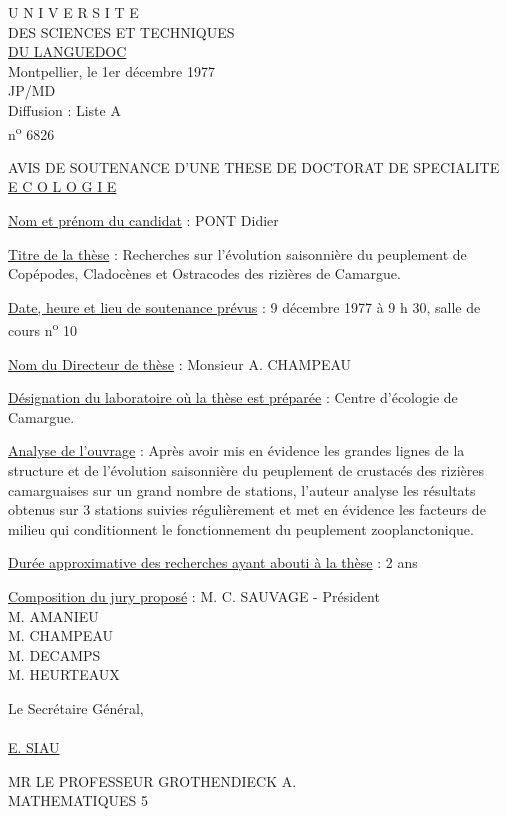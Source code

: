 
U N I V E R S I T E\\ DES SCIENCES ET TECHNIQUES\\ \uline{DU LANGUEDOC}\\
Montpellier, le 1er décembre 1977\\

JP/MD\\ Diffusion : Liste A\\ n\textsuperscript{o} 6826

AVIS DE SOUTENANCE D'UNE THESE DE DOCTORAT DE SPECIALITE\\ \uline{E C O L O G I E}

\uline{Nom et prénom du candidat} : PONT Didier

\uline{Titre de la thèse} : Recherches sur l'évolution saisonnière du peuplement de Copépodes, Cladocènes et Ostracodes des rizières de Camargue.

\uline{Date, heure et lieu de soutenance prévus} : 9 décembre 1977 à 9 h 30, salle de cours n\textsuperscript{o} 10

\uline{Nom du Directeur de thèse} : Monsieur A. CHAMPEAU

\uline{Désignation du laboratoire où la thèse est préparée} : Centre d'écologie de Camargue.

\uline{Analyse de l'ouvrage} : Après avoir mis en évidence les grandes lignes de la structure et de l'évolution saisonnière du peuplement de crustacés des rizières camarguaises sur un grand nombre de stations, l'auteur analyse les résultats obtenus sur 3 stations suivies régulièrement et met en évidence les facteurs de milieu qui conditionnent le fonctionnement du peuplement zooplanctonique.

\uline{Durée approximative des recherches ayant abouti à la thèse} : 2 ans

\uline{Composition du jury proposé} : M. C. SAUVAGE - Président\\ M. AMANIEU\\ M. CHAMPEAU\\ M. DECAMPS\\ M. HEURTEAUX

Le Secrétaire Général,\\
\\
\uline{E. SIAU}

MR LE PROFESSEUR GROTHENDIECK A.\\ MATHEMATIQUES \hfill 5
